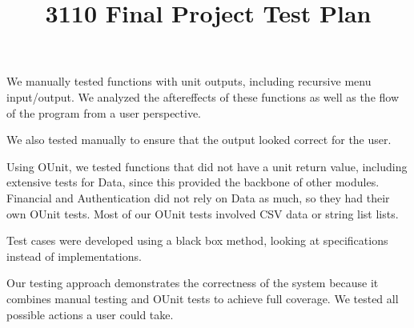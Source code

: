\documentclass{article}
\begin{document}
\setlength\parindent{0pt}

\title{3110 Final Project Test Plan}
\maketitle

We manually tested functions with unit outputs, including recursive menu
input/output. We analyzed the aftereffects of these functions as well as
the flow of the program from a user perspective.
\vspace{10pt}

We also tested manually to ensure that the output looked correct for the user. \vspace{10pt}

Using OUnit, we tested functions that did not have a unit return value, including extensive tests for Data, since this provided the backbone of
other modules. Financial and Authentication did not rely on Data as much, so they had their own OUnit tests. Most of our OUnit tests involved CSV data
or string list lists. \vspace{5pt}

Test cases were developed using a black box method, looking at specifications instead of implementations. \vspace{10pt}

Our testing approach demonstrates the correctness of the system because it
combines manual testing and OUnit tests to achieve full coverage. We tested
all possible actions a user could take.
\end{document}

